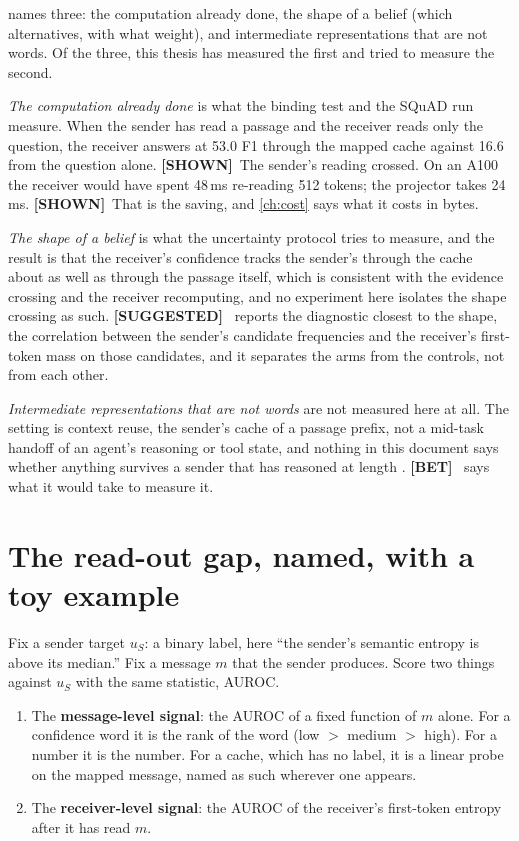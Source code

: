 \documentclass[11pt,a4paper]{report}
\newcommand{\SHOWN}{\textcolor{shownc}{\textbf{\scriptsize[SHOWN]}}}
\newcommand{\SUGG}{\textcolor{suggc}{\textbf{\scriptsize[SUGGESTED]}}}
\newcommand{\BET}{\textcolor{betc}{\textbf{\scriptsize[BET]}}}
\begin{document}
 names three: the computation already done, the shape of a belief (which alternatives, with what weight), and intermediate representations that are not words. Of the three, this thesis has measured the first and tried to measure the second.

\emph{The computation already done} is what the binding test and the SQuAD run measure. When the sender has read a passage and the receiver reads only the question, the receiver answers at 53.0 F1 through the mapped cache against 16.6 from the question alone. \SHOWN\ The sender's reading crossed. On an A100 the receiver would have spent 48\,ms re-reading 512 tokens; the projector takes 24\,ms. \SHOWN\ That is the saving, and \cref{ch:cost} says what it costs in bytes.

\emph{The shape of a belief} is what the uncertainty protocol tries to measure, and the result is that the receiver's confidence tracks the sender's through the cache about as well as through the passage itself, which is consistent with the evidence crossing and the receiver recomputing, and no experiment here isolates the shape crossing as such. \SUGG\  reports the diagnostic closest to the shape, the correlation between the sender's candidate frequencies and the receiver's first-token mass on those candidates, and it separates the arms from the controls, not from each other.

\emph{Intermediate representations that are not words} are not measured here at all. The setting is context reuse, the sender's cache of a passage prefix, not a mid-task handoff of an agent's reasoning or tool state, and nothing in this document says whether anything survives a sender that has reasoned at length \citep{2608.20927}. \BET\  says what it would take to measure it.

\section{The read-out gap, named, with a toy example}
\label{sec:readout}

Fix a sender target $u_S$: a binary label, here ``the sender's semantic entropy is above its median.'' Fix a message $m$ that the sender produces. Score two things against $u_S$ with the same statistic, AUROC.

\begin{enumerate}
\item The \textbf{message-level signal}: the AUROC of a fixed function of $m$ alone. For a confidence word it is the rank of the word (low $>$ medium $>$ high). For a number it is the number. For a cache, which has no label, it is a linear probe on the mapped message, named as such wherever one appears.
\item The \textbf{receiver-level signal}: the AUROC of the receiver's first-token entropy after it has read $m$.
\end{enumerate}
\end{document}
